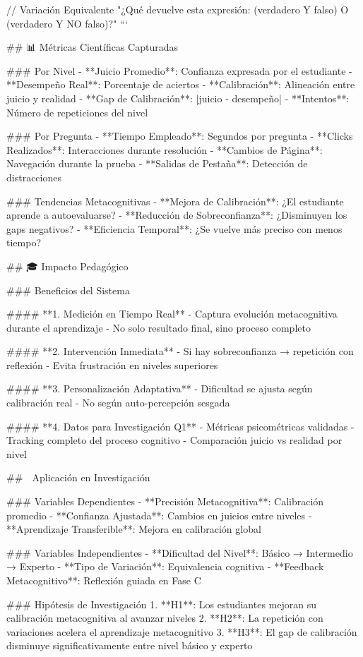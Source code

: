 // Variación Equivalente
"¿Qué devuelve esta expresión: (verdadero Y falso) O (verdadero Y NO falso)?"
```

## 📊 Métricas Científicas Capturadas

### Por Nivel
- **Juicio Promedio**: Confianza expresada por el estudiante
- **Desempeño Real**: Porcentaje de aciertos
- **Calibración**: Alineación entre juicio y realidad
- **Gap de Calibración**: |juicio - desempeño|
- **Intentos**: Número de repeticiones del nivel

### Por Pregunta
- **Tiempo Empleado**: Segundos por pregunta
- **Clicks Realizados**: Interacciones durante resolución
- **Cambios de Página**: Navegación durante la prueba
- **Salidas de Pestaña**: Detección de distracciones

### Tendencias Metacognitivas
- **Mejora de Calibración**: ¿El estudiante aprende a autoevaluarse?
- **Reducción de Sobreconfianza**: ¿Disminuyen los gaps negativos?
- **Eficiencia Temporal**: ¿Se vuelve más preciso con menos tiempo?

## 🎓 Impacto Pedagógico

### Beneficios del Sistema

#### **1. Medición en Tiempo Real**
- Captura evolución metacognitiva durante el aprendizaje
- No solo resultado final, sino proceso completo

#### **2. Intervención Inmediata**
- Si hay sobreconfianza → repetición con reflexión
- Evita frustración en niveles superiores

#### **3. Personalización Adaptativa**
- Dificultad se ajusta según calibración real
- No según auto-percepción sesgada

#### **4. Datos para Investigación Q1**
- Métricas psicométricas validadas
- Tracking completo del proceso cognitivo
- Comparación juicio vs realidad por nivel

## 🔬 Aplicación en Investigación

### Variables Dependientes
- **Precisión Metacognitiva**: Calibración promedio
- **Confianza Ajustada**: Cambios en juicios entre niveles
- **Aprendizaje Transferible**: Mejora en calibración global

### Variables Independientes
- **Dificultad del Nivel**: Básico → Intermedio → Experto
- **Tipo de Variación**: Equivalencia cognitiva
- **Feedback Metacognitivo**: Reflexión guiada en Fase C

### Hipótesis de Investigación
1. **H1**: Los estudiantes mejoran su calibración metacognitiva al avanzar niveles
2. **H2**: La repetición con variaciones acelera el aprendizaje metacognitivo
3. **H3**: El gap de calibración disminuye significativamente entre nivel básico y experto

